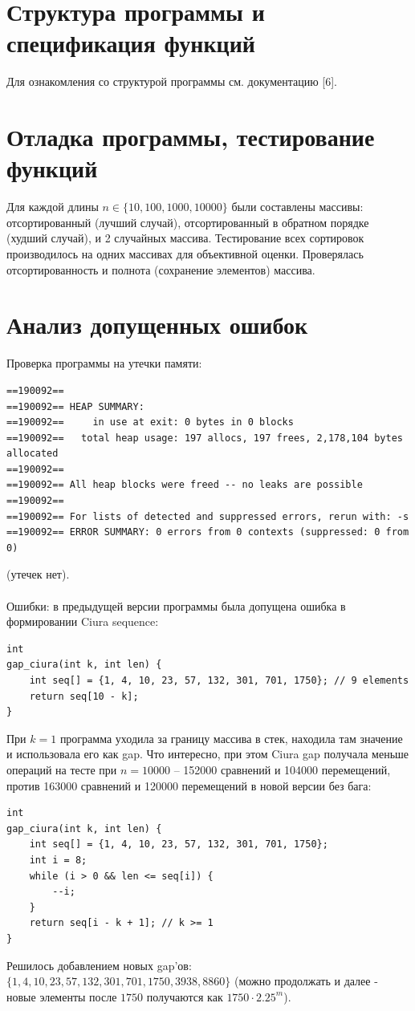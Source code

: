 \documentclass[a4paper,12pt,titlepage,finall]{article}
\begin{document}
\section{Структура программы и спецификация функций}
Для ознакомления со структурой программы см. документацию [6].
\newpage

\section{Отладка программы, тестирование функций}
Для каждой длины $n \in \{10, 100, 1000, 10000\}$ были составлены массивы: отсортированный (лучший случай), отсортированный в обратном порядке (худший случай), и 2 случайных массива. Тестирование всех сортировок производилось на одних массивах для объективной оценки. Проверялась отсортированность и полнота (сохранение элементов) массива.
\newpage

\section{Анализ допущенных ошибок}
Проверка программы на утечки памяти:
\begin{verbatim}
==190092== 
==190092== HEAP SUMMARY:
==190092==     in use at exit: 0 bytes in 0 blocks
==190092==   total heap usage: 197 allocs, 197 frees, 2,178,104 bytes allocated
==190092== 
==190092== All heap blocks were freed -- no leaks are possible
==190092== 
==190092== For lists of detected and suppressed errors, rerun with: -s
==190092== ERROR SUMMARY: 0 errors from 0 contexts (suppressed: 0 from 0)
\end{verbatim}
(утечек нет).\\\\
Ошибки:
в предыдущей версии программы была допущена ошибка в формировании Ciura sequence:
\begin{verbatim}
int
gap_ciura(int k, int len) {
    int seq[] = {1, 4, 10, 23, 57, 132, 301, 701, 1750}; // 9 elements
    return seq[10 - k];
}
\end{verbatim}
При $k=1$ программа уходила за границу массива в стек, находила там значение и использовала его как gap. Что интересно, при этом Ciura gap получала меньше операций на тесте при $n=10000$ -- 152000 сравнений и 104000 перемещений, против 163000 сравнений и 120000 перемещений в новой версии без бага:
\begin{verbatim}
int
gap_ciura(int k, int len) {
    int seq[] = {1, 4, 10, 23, 57, 132, 301, 701, 1750};
    int i = 8;
    while (i > 0 && len <= seq[i]) {
        --i;
    }
    return seq[i - k + 1]; // k >= 1
}
\end{verbatim}
Решилось добавлением новых gap'ов: $\{1, 4, 10, 23, 57, 132, 301, 701, 1750, 3938, 8860\}$ (можно продолжать и далее - новые элементы после $1750$ получаются как $1750\cdot 2.25^m$).
\end{document}
